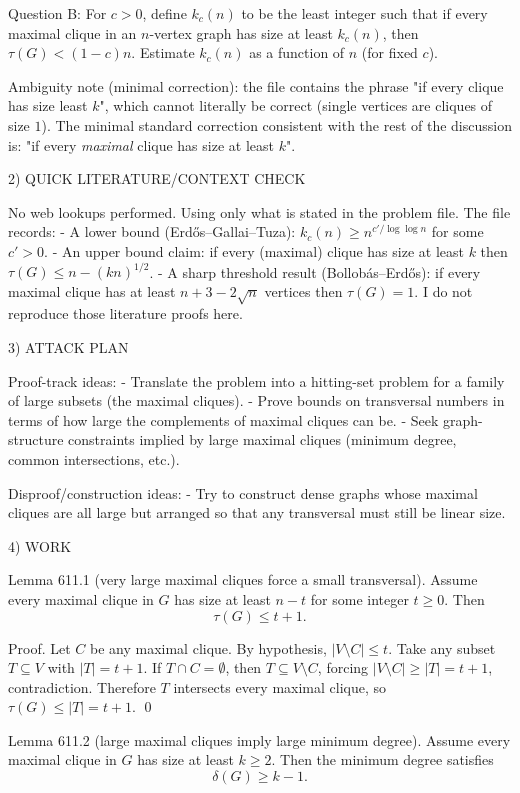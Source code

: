 Question B: For $c>0$, define $k_c(n)$ to be the least integer such that if every maximal clique in an $n$-vertex graph has size at least $k_c(n)$, then $\tau(G)<(1-c)n$.
Estimate $k_c(n)$ as a function of $n$ (for fixed $c$).

Ambiguity note (minimal correction): the file contains the phrase "if every clique has size least $k$", which cannot literally be correct (single vertices are cliques of size $1$).
The minimal standard correction consistent with the rest of the discussion is: "if every \emph{maximal} clique has size at least $k$".

2) QUICK LITERATURE/CONTEXT CHECK

No web lookups performed. Using only what is stated in the problem file.
The file records:
- A lower bound (Erd\H{o}s--Gallai--Tuza): $k_c(n)\ge n^{c'/\log\log n}$ for some $c'>0$.
- An upper bound claim: if every (maximal) clique has size at least $k$ then $\tau(G)\le n-(kn)^{1/2}$.
- A sharp threshold result (Bollob\'{a}s--Erd\H{o}s): if every maximal clique has at least $n+3-2\sqrt n$ vertices then $\tau(G)=1$.
I do not reproduce those literature proofs here.

3) ATTACK PLAN

Proof-track ideas:
- Translate the problem into a hitting-set problem for a family of large subsets (the maximal cliques).
- Prove bounds on transversal numbers in terms of how large the complements of maximal cliques can be.
- Seek graph-structure constraints implied by large maximal cliques (minimum degree, common intersections, etc.).

Disproof/construction ideas:
- Try to construct dense graphs whose maximal cliques are all large but arranged so that any transversal must still be linear size.

4) WORK

Lemma 611.1 (very large maximal cliques force a small transversal).
Assume every maximal clique in $G$ has size at least $n-t$ for some integer $t\ge 0$.
Then
\[
\tau(G)\le t+1.
\]

Proof.
Let $C$ be any maximal clique. By hypothesis, $|V\setminus C|\le t$.
Take any subset $T\subseteq V$ with $|T|=t+1$.
If $T\cap C=\emptyset$, then $T\subseteq V\setminus C$, forcing $|V\setminus C|\ge |T|=t+1$, contradiction.
Therefore $T$ intersects every maximal clique, so $\tau(G)\le |T|=t+1$.
\qed

Lemma 611.2 (large maximal cliques imply large minimum degree).
Assume every maximal clique in $G$ has size at least $k\ge 2$.
Then the minimum degree satisfies
\[
\delta(G)\ge k-1.
\]

